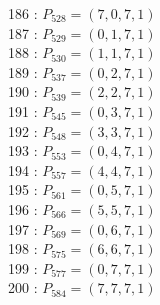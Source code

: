 \documentclass{article}
\begin{document}
{\begin{multicols}{3}
186 : $P_{528}=( 7, 0, 7, 1 )$\\
187 : $P_{529}=( 0, 1, 7, 1 )$\\
188 : $P_{530}=( 1, 1, 7, 1 )$\\
189 : $P_{537}=( 0, 2, 7, 1 )$\\
190 : $P_{539}=( 2, 2, 7, 1 )$\\
191 : $P_{545}=( 0, 3, 7, 1 )$\\
192 : $P_{548}=( 3, 3, 7, 1 )$\\
193 : $P_{553}=( 0, 4, 7, 1 )$\\
194 : $P_{557}=( 4, 4, 7, 1 )$\\
195 : $P_{561}=( 0, 5, 7, 1 )$\\
196 : $P_{566}=( 5, 5, 7, 1 )$\\
197 : $P_{569}=( 0, 6, 7, 1 )$\\
198 : $P_{575}=( 6, 6, 7, 1 )$\\
199 : $P_{577}=( 0, 7, 7, 1 )$\\
200 : $P_{584}=( 7, 7, 7, 1 )$\\
\end{multicols}


%


%


}%
\end{document}
